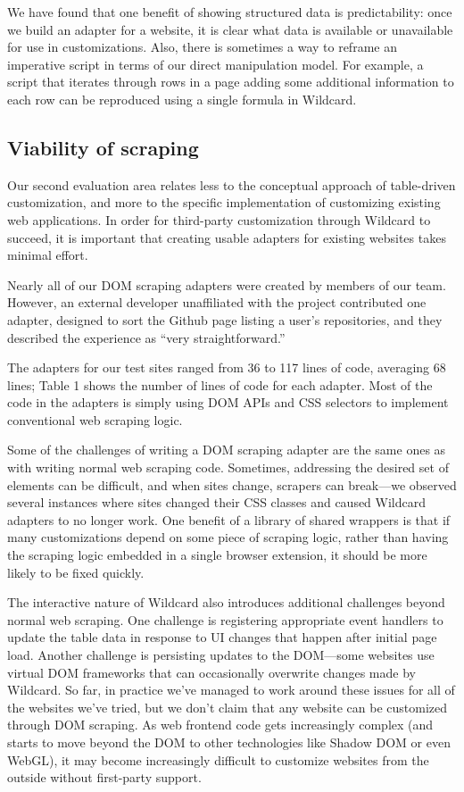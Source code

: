 \documentclass[sigplan,screen,10pt,anonymous,review]{acmart}
\begin{document}
We have found that one benefit of showing structured data is
predictability: once we build an adapter for a website, it is clear what
data is available or unavailable for use in customizations. Also, there
is sometimes a way to reframe an imperative script in terms of our
direct manipulation model. For example, a script that iterates through
rows in a page adding some additional information to each row can be
reproduced using a single formula in Wildcard.

\hypertarget{viability-of-scraping}{%
\subsection{Viability of scraping}\label{viability-of-scraping}}

Our second evaluation area relates less to the conceptual approach of
table-driven customization, and more to the specific implementation of
customizing existing web applications. In order for third-party
customization through Wildcard to succeed, it is important that creating
usable adapters for existing websites takes minimal effort.

Nearly all of our DOM scraping adapters were created by members of our
team. However, an external developer unaffiliated with the project
contributed one adapter, designed to sort the Github page listing a
user's repositories, and they described the experience as ``very
straightforward.''

The adapters for our test sites ranged from 36 to 117 lines of code,
averaging 68 lines; Table 1 shows the number of lines of code for each
adapter. Most of the code in the adapters is simply using DOM APIs and
CSS selectors to implement conventional web scraping logic.

Some of the challenges of writing a DOM scraping adapter are the same
ones as with writing normal web scraping code. Sometimes, addressing the
desired set of elements can be difficult, and when sites change,
scrapers can break---we observed several instances where sites changed
their CSS classes and caused Wildcard adapters to no longer work. One
benefit of a library of shared wrappers is that if many customizations
depend on some piece of scraping logic, rather than having the scraping
logic embedded in a single browser extension, it should be more likely
to be fixed quickly.

The interactive nature of Wildcard also introduces additional challenges
beyond normal web scraping. One challenge is registering appropriate
event handlers to update the table data in response to UI changes that
happen after initial page load. Another challenge is persisting updates
to the DOM---some websites use virtual DOM frameworks that can
occasionally overwrite changes made by Wildcard. So far, in practice
we've managed to work around these issues for all of the websites we've
tried, but we don't claim that any website can be customized through DOM
scraping. As web frontend code gets increasingly complex (and starts to
move beyond the DOM to other technologies like Shadow DOM or even
WebGL), it may become increasingly difficult to customize websites from
the outside without first-party support.
\end{document}
